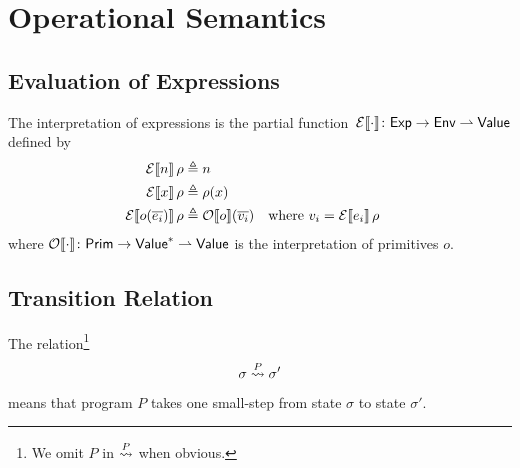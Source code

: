 \documentclass[11pt]{article}
\begin{document}
\section{Operational Semantics}
\subsection{Evaluation of Expressions}
The interpretation of expressions is the partial function~$\mathcal{E}\llbracket \cdot \rrbracket \colon \textsf{Exp} \to \textsf{Env} \rightharpoonup \textsf{Value}$ defined by
\begin{align*}
\mathcal{E}\llbracket n \rrbracket\, \rho                &\triangleq n \\
\mathcal{E}\llbracket x \rrbracket\, \rho                &\triangleq \rho(x) \\
\mathcal{E}\llbracket o(\overline{e_i}) \rrbracket\, \rho &\triangleq
  \mathcal O\llbracket o\rrbracket (\overline{v_i})
  && \text{where $v_i = \mathcal{E}\llbracket e_i \rrbracket\, \rho$}
\end{align*}
where $\mathcal O\llbracket \cdot \rrbracket \colon \textsf{Prim} \to \textsf{Value}^\ast \rightharpoonup \textsf{Value}$ is the interpretation of primitives $o$.

\subsection{Transition Relation}
The relation\footnote{We omit $P$ in $\overset{P}{\rightsquigarrow}$ when obvious.}
\[
\sigma \overset{P}{\rightsquigarrow} \sigma'
\]
means that program $P$ takes one small-step from state $\sigma$ to state $\sigma'$.
\end{document}
